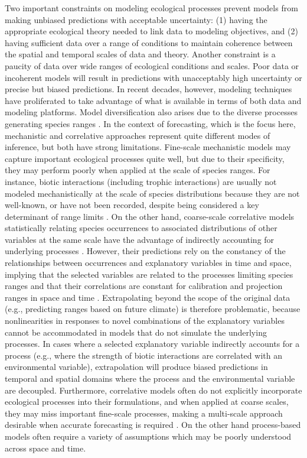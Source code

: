 \documentclass[11pt]{article}
\begin{document}
Two important constraints on modeling ecological processes prevent models from making unbiased predictions with acceptable uncertainty: (1) having the appropriate ecological theory needed to link data to modeling objectives, and (2) having sufficient data over a range of conditions to maintain coherence between the spatial and temporal scales of data and theory.
Another constraint is a paucity of data over wide ranges of ecological conditions and scales.
Poor data or incoherent models will result in predictions with unacceptably high uncertainty or precise but biased predictions.
In recent decades, however, modeling techniques have proliferated to take advantage of what is available in terms of both data and modeling platforms.
Model diversification also arises due to the diverse processes generating species ranges \citep{Soberon2007}.
In the context of forecasting, which is the focus here, mechanistic and correlative approaches represent quite different modes of inference, but both have strong limitations. 
Fine-scale mechanistic models may capture important ecological processes quite well, but due to their specificity, they may perform poorly when applied at the scale of species ranges.
For instance, biotic interactions (including trophic interactions) are usually not modeled mechanistically at the scale of species distributions because they are not well-known, or have not been recorded, despite being considered a key determinant of range limits \citep{Holt2005, Soberon2007, Pigot2013}. 
On the other hand, coarse-scale correlative models statistically relating species occurrences to associated distributions of other variables at the same scale have the advantage of indirectly accounting for underlying processes \citep{Guisan2000}.
However, their predictions rely on the constancy of the relationships between occurrences and explanatory variables in time and space, implying that the selected variables are related to the processes limiting species ranges and that their correlations are constant for calibration and projection ranges in space and time \citep{Dormann2007}. 
Extrapolating beyond the scope of the original data (e.g., predicting ranges based on future climate) is therefore problematic, because nonlinearities in responses to novel combinations of the explanatory variables cannot be accommodated in models that do not simulate the underlying processes.
In cases where a selected explanatory variable indirectly accounts for a process (e.g., where the strength of biotic interactions are correlated with an environmental variable), extrapolation will produce biased predictions in temporal and spatial domains where the process and the environmental variable are decoupled.
Furthermore, correlative models often do not explicitly incorporate ecological processes into their formulations, and when applied at coarse scales, they may miss important fine-scale processes, making a multi-scale approach desirable when accurate forecasting is required \citep{Thuiller2013}.
On the other hand process-based models often require a variety of assumptions which may be poorly understood across space and time.
\end{document}
